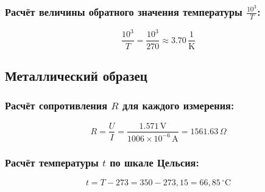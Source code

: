 \subsubsection*{Расчёт величины обратного значения температуры $\frac{10^3}{T}$:}
\[
\frac{10^3}{T} = \frac{10^3}{270} \approx 3.70 \, \frac{1}{\text{K}}
\]

\subsection*{Металлический образец}

\subsubsection*{Расчёт сопротивления $R$ для каждого измерения:}
\[
R = \frac{U}{I} = \frac{1.571 \, \text{V}}{1006 \times 10^{-6} \, \text{A}} = 1561.63 \, \Omega
\]

\subsubsection*{Расчёт температуры $t$ по шкале Цельсия:}
\[
t = T - 273 = 350 - 273,15 = 66,85 \, ^\circ\text{C}
\]